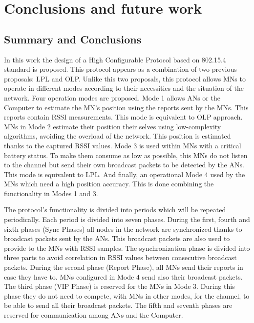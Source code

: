 \chapter{Conclusions and future work}
\label{chap:conclusionsandfuture}

\section{Summary and Conclusions}

In this work the design of a High Configurable Protocol based on 802.15.4 standard is proposed. This protocol appears as a combination of two
previous proposals: \ac{LPL} and \ac{OLP}. Unlike this two proposals, this protocol allows \acp{MN} to operate in different modes according to 
their necessities and the situation of the network. Four operation modes are proposed. Mode 1 allows \acp{AN} or the Computer to estimate the 
\ac{MN}'s position using the reports sent by the \acp{MN}. This reports contain \ac{RSSI} measurements. This mode is equivalent to \ac{OLP}
approach. \acp{MN} in Mode 2 estimate their position their selves using low-complexity algorithms, avoiding the overload of the network. This 
position is estimated thanks to the captured \ac{RSSI} values. Mode 3 is used within \acp{MN} with a critical battery status. To make them 
consume as low as possible, this \acp{MN} do not listen to the channel but send their own broadcast packets to be detected by the \acp{AN}. 
This mode is equivalent to \ac{LPL}. And finally, an operational Mode 4 used by the \acp{MN} which need a high position accuracy. This is 
done combining the functionality in Modes 1 and 3.

The protocol's functionality is divided into periods which will be repeated periodically. Each period is divided into seven phases. During 
the first, fourth and sixth phases (Sync Phases) all nodes in the network are synchronized thanks to broadcast packets sent by the \acp{AN}. 
This broadcast packets are also used to provide to the \acp{MN} with \ac{RSSI} samples. The synchronization phase is divided into three parts 
to avoid correlation in \ac{RSSI} values between consecutive broadcast packets. During the second phase (Report Phase), all \acp{MN} send their
reports in case they have to. \acp{MN} configured in Mode 4 send also their broadcast packets. The third phase (\ac{VIP} Phase) is reserved for the \acp{MN} in Mode
3. During this phase they do not need to compete, with \acp{MN} in other modes, for the channel, to be able to send all their broadcast packets. 
The fifth and seventh phases are reserved for communication among \acp{AN} and the Computer.

